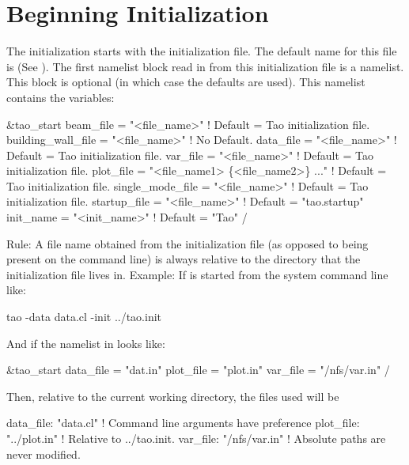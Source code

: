 \section{Beginning Initialization}
\label{s:init.global} 

The initialization starts with the \tao initialization file. The default name for
this file is  (See ).
The first namelist block read in from this initialization file is a 
 namelist. This block is optional (in which case the defaults
are used).  This namelist contains the variables:
\begin{example}
  &tao_start
    beam_file          = "<file_name>"  ! Default = Tao initialization file.
    building_wall_file = "<file_name>"  ! No Default.
    data_file          = "<file_name>"  ! Default = Tao initialization file.
    var_file           = "<file_name>"  ! Default = Tao initialization file.
    plot_file          = "<file_name1> \{<file_name2>\} ..."  
                                       ! Default = Tao initialization file.
    single_mode_file   = "<file_name>"  ! Default = Tao initialization file.
    startup_file       = "<file_name>"  ! Default = "tao.startup"
    init_name          = "<init_name>"  ! Default = "Tao"
  /
\end{example}
Rule: A file name obtained from the \tao initialization file (as opposed to
being present on the command line) is always relative to the directory
that the \tao initialization file lives in. Example: If \tao is started from
the system command line like:
\begin{example}
    tao -data data.cl -init ../tao.init
\end{example}
And if the  namelist in  looks like:
\begin{example}
  &tao_start
    data_file = "dat.in"
    plot_file = "plot.in"
    var_file  = "/nfs/var.in"
  /
\end{example}
Then, relative to the current working directory, the files used will be
\begin{example}
  data_file: "data.cl"      ! Command line arguments have preference
  plot_file: "../plot.in"   ! Relative to ../tao.init.
  var_file:  "/nfs/var.in"  ! Absolute paths are never modified.
\end{example}


